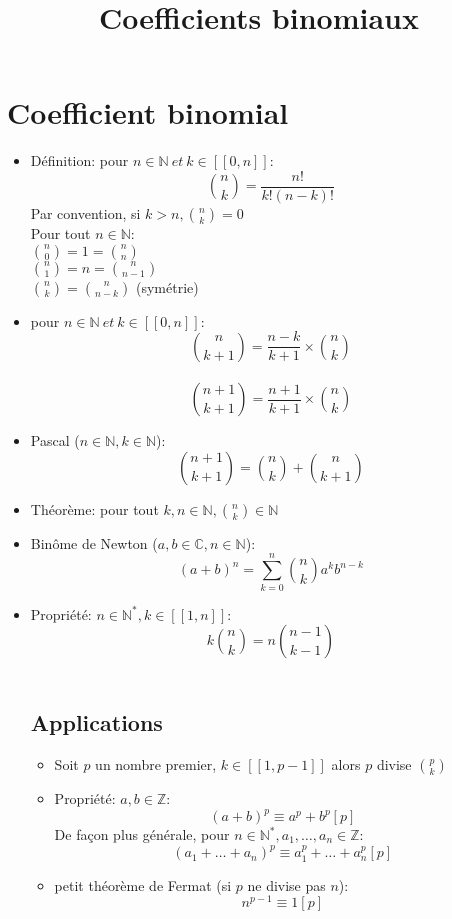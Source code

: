 \documentclass[fleqn]{article}
\title{Coefficients binomiaux}
\date{}
\begin{document}
\maketitle

\section{Coefficient binomial}
\begin{itemize}
	\item D\'{e}finition: pour \(n \in \mathbb{N}\ et\ k \in [\![0,n]\!]\): \\
		\[ \binom{n}{k} = \frac{n!}{k!(n-k)!} \]
		Par convention, si \(k>n, \binom{n}{k} = 0\) \\
		Pour tout \(n \in \mathbb{N}:\) \\
		\(\binom{n}{0} = 1 = \binom{n}{n}\) \\
		\(\binom{n}{1} = n = \binom{n}{n-1}\) \\
		\(\binom{n}{k} = \binom{n}{n-k}\) (sym\'etrie)
	\item pour \(n \in \mathbb{N}\ et\ k \in [\![0,n]\!]\): \\
		\[\binom{n}{k+1} = \frac{n-k}{k+1} \times \binom{n}{k} \] \\
		\[\binom{n+1}{k+1} = \frac{n+1}{k+1} \times \binom{n}{k} \]
	\item Pascal (\(n \in \mathbb{N}, k \in \mathbb{N}\)): \\
		\[\binom{n+1}{k+1} = \binom{n}{k} + \binom{n}{k+1}\]
	\item Th\'{e}or\`{e}me: pour tout \(k,n \in \mathbb{N}, \binom{n}{k} \in \mathbb{N}\) \\
	\item Bin\^{o}me de Newton (\(a,b \in \mathbb{C}, n \in \mathbb{N}\)): \\
		\[(a+b)^n = \sum_{k=0}^{n} \binom{n}{k}a^kb^{n-k}\]
	\item Propri\'{e}t\'{e}: \(n \in \mathbb{N}^*, k \in [\![1,n]\!]\): \\
		\[k\binom{n}{k} = n\binom{n-1}{k-1}\] \\
	\subsection{Applications}
	\begin{itemize}
		\item Soit \(p\) un nombre premier, \(k \in [\![1,p-1]\!]\) alors \(p\) divise \(\binom{p}{k}\) \\
		\item Propri\'{e}t\'{e}: \(a,b \in \mathbb{Z}\): \\
			\[(a+b)^p \equiv a^p + b^p [p]\]
			De fa\c{c}on plus g\'{e}n\'{e}rale, pour \(n \in \mathbb{N}^*, a_1, \hdots, a_n \in \mathbb{Z}\): \\
			\[(a_1+\hdots+a_n)^p \equiv a_1^p+\hdots+a_n^p [p]\]
		\item petit th\'{e}or\`{e}me de Fermat (si \(p\) ne divise pas \(n\)): \\
			\[n^{p-1} \equiv 1[p] \]
	\end{itemize}
\end{itemize}
\end{document}
